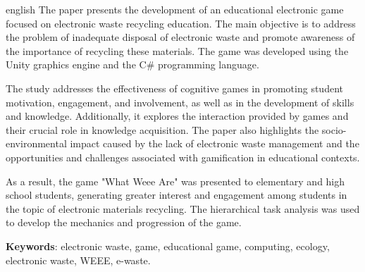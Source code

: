 \begin{resumo}[Abstract]
 \begin{otherlanguage*}{english}
The paper presents the development of an educational electronic game focused on electronic waste recycling education. The main objective is to address the problem of inadequate disposal of electronic waste and promote awareness of the importance of recycling these materials. The game was developed using the Unity graphics engine and the C\# programming language.

The study addresses the effectiveness of cognitive games in promoting student motivation, engagement, and involvement, as well as in the development of skills and knowledge. Additionally, it explores the interaction provided by games and their crucial role in knowledge acquisition. The paper also highlights the socio-environmental impact caused by the lack of electronic waste management and the opportunities and challenges associated with gamification in educational contexts.

As a result, the game "What Weee Are" was presented to elementary and high school students, generating greater interest and engagement among students in the topic of electronic materials recycling. The hierarchical task analysis was used to develop the mechanics and progression of the game.
   \vspace{\onelineskip}
 
   \noindent 
   \textbf{Keywords}: electronic waste, game, educational game, computing, ecology, electronic waste, WEEE, e-waste.
 \end{otherlanguage*}
\end{resumo}